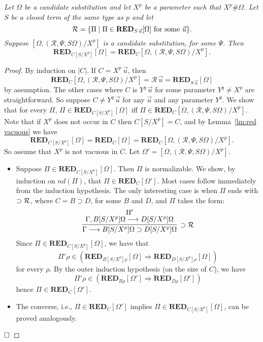 \documentclass[preprint]{elsarticle}
\def\Rscr{{\mathcal R}}
\newcommand{\Seq}[2]{#1\longrightarrow #2}
\newcommand{\oimpR}{\oimp{\cal R}}
\newcommand{\oimp}{\supset}
\def\RED{{\mathbf{RED}}}
\def\qed{$\hfill\Box$}
\newenvironment{lemmacp}[1]{\noindent {\bf Lemma~\ref{#1}.} \em}{}
\begin{document}
\begin{lemmacp}{lm:red param subst}
Let $\Omega$ be a candidate substitution and let $X^p$
be a parameter such that $X^p \# \Omega$. 
Let $S$ be a closed term of the same type as $p$ and let
$$
\Rscr = \{\Pi \mid \Pi \in \RED_{S\,\vec u}[\Omega] \ \hbox{for some $\vec u$} \}.
$$
Suppose $[\Omega, (\Rscr, \Psi, S\Omega)/ X^p]$ is a candidate
substitution, for some $\Psi$. 
Then
$$
\RED_{C[S/X^p]}[\Omega] = \RED_C[\Omega, (\Rscr, \Psi, S\Omega)/X^p].
$$
\end{lemmacp}
\begin{proof}
By induction on $|C|$. 
If $C = X^p \,\vec u$, then
$$\RED_C[\Omega, (\Rscr, \Psi,S\Omega)/X^p] = \Rscr\,\vec u = \RED_{S\,\vec u}[\Omega]$$
by assumption. The other cases where $C$ is $Y^q\,\vec u$
for some parameter $Y^q \not = X^p$ are straightforward. 
So suppose $C \not = Y^q\,\vec u$ for any $\vec u$ and any parameter $Y^q$. 
We show that for every $\Pi$, $\Pi \in \RED_{C[S/X^p]}[\Omega]$
iff $\Pi \in \RED_C[\Omega, (\Rscr, \Psi, S\Omega)/X^p]$. 
Note that if $X^p$ does not occur in $C$ then
$C[S/X^p] = C$, and by Lemma~\ref{lm:red vacuous} we have
$$
\RED_{C[S/X^p]}[\Omega] = \RED_C[\Omega]=\RED_C[\Omega, (\Rscr, \Psi, S\Omega)/X^p].
$$
So assume that $X^p$ is not vacuous in $C$. 
Let $\Omega' = [\Omega, (\Rscr, \Psi, S\Omega)/X^p]$. 
\begin{itemize}
\item Suppose $\Pi \in \RED_{C[S/X^p]}[\Omega]$. 
Then $\Pi$ is normalizable. We show, by induction on $nd(\Pi)$,
that $\Pi \in \RED_C[\Omega']$. 
Most cases follow immediately from the induction hypothesis.
The only interesting case is when $\Pi$ ends with $\oimpR$,
where $C = B \oimp D$, for some $B$ and $D$,  and $\Pi$ takes
the form:
$$
\infer[\oimpR]
{\Seq \Gamma {B[S/X^p]\Omega \oimp D[S/X^p]\Omega}}
{
  \deduce{\Seq {\Gamma, B[S/X^p]\Omega}{D[S/X^p]\Omega}}{\Pi'}
}
$$
Since $\Pi \in \RED_{C[S/X^p]}[\Omega]$, we have that
$$
\Pi'\rho \in (\RED_{B[S/X^p]\rho}[\Omega] \Rightarrow \RED_{D[S/X^p]\rho}[\Omega])
$$
for every $\rho$.
By the outer induction hypothesis (on the size of $C$), we have 
$$
\Pi'\rho \in (\RED_{B\rho}[\Omega'] \Rightarrow \RED_{D\rho}[\Omega'])
$$
hence $\Pi \in \RED_{C}[\Omega']$. 

\item The converse, i.e., $\Pi \in \RED_C[\Omega']$
implies $\Pi \in \RED_{C[S/X^p]}[\Omega]$, can be proved analogously.
\end{itemize}
\qed
\end{proof}
\end{document}
